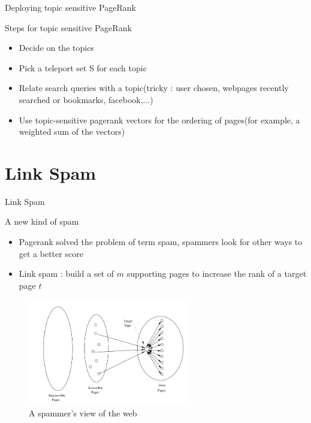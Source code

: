 \documentclass[10pt]{beamer}
\begin{document}
\begin{frame}{Deploying topic sensitive PageRank}
  \begin{block}{Steps for topic sensitive PageRank}
    \begin{itemize}
      \item Decide on the topics
      \item Pick a teleport set S for each topic
      \item Relate search queries with a topic(tricky : user chosen, webpages recently searched or bookmarks, facebook,...)
      \item Use topic-sensitive pagerank vectors for the ordering of pages(for example, a weighted sum of the vectors)
    \end{itemize}
  \end{block}
\end{frame}


\section{Link Spam}
\begin{frame}
  \tableofcontents[currentsection]
\end{frame}
\begin{frame}{Link Spam}
\begin{block}{A new kind of spam}
\begin{itemize}
\item Pagerank solved the problem of term spam, spammers look for other ways to get a better score
\item Link spam : build a set of $m$ supporting pages to increase the rank of a target page $t$
\end{itemize}
\end{block}
\begin{figure}
\centering
	\includegraphics[width=7cm]{SpamFarm.png}
\caption{A spammer's view of the web}
\end{figure}
\end{frame}
\end{document}
